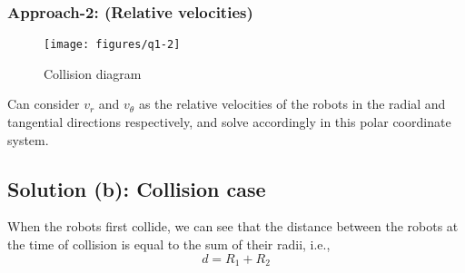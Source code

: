\vspace*{-1em}
\subsubsection*{Approach-2: (Relative velocities)}

\vspace*{-3em}
\begin{figure}[htbp]
    \centering
    \texttt{[image: figures/q1-2]}
    \vspace*{-2em}
    \caption{
        Collision diagram
    }\label{fig:q1-2}
\end{figure}

Can consider \( v_r \) and \( v_\theta \) as the relative velocities of the robots in the radial and tangential directions respectively, and solve accordingly in this polar coordinate system.

\vspace*{-1em}
\subsection*{Solution (b): Collision case}

When the robots first collide, we can see that the distance between the robots at the time of collision is equal to the sum of their radii, i.e.,
\begin{equation*}
    d = R_1 + R_2
\end{equation*}
